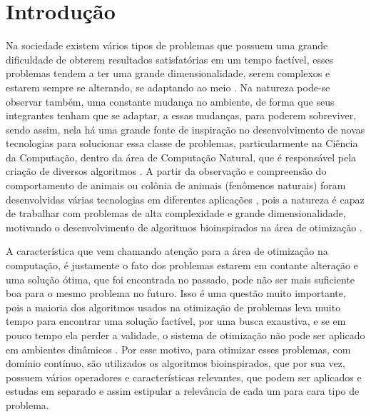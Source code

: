 \chapter{Introdução}
\label{ch:intro}

Na sociedade existem vários tipos de problemas que possuem uma grande dificuldade de obterem resultados satisfatórias em um tempo factível, esses problemas tendem a ter uma grande dimensionalidade, serem complexos e estarem sempre se alterando, se adaptando ao meio \cite{de2004otimizaccao}. Na natureza pode-se observar também, uma constante mudança no ambiente, de forma que seus integrantes tenham que se adaptar, a essas mudanças, para poderem sobreviver, sendo assim, nela há uma grande fonte de inspiração no desenvolvimento de novas tecnologias para solucionar essa classe de problemas, particularmente na Ciência da Computação, dentro da área de Computação Natural, que é responsável pela criação de diversos algoritmos \cite{de2007fundamentals}. A partir da observação e compreensão do comportamento de animais ou colônia de animais (fenômenos naturais) foram desenvolvidas várias tecnologias em diferentes aplicações \cite{rozenberg2011handbook}, pois a natureza é capaz de trabalhar com problemas de alta complexidade e grande dimensionalidade, motivando o desenvolvimento de algoritmos bioinspirados na área de otimização \cite{andre2015multiple}.

A característica que vem chamando atenção para a área de otimização na computação, é justamente o fato dos problemas estarem em contante alteração e uma solução ótima, que foi encontrada no passado, pode não ser mais suficiente boa para o mesmo problema no futuro. Isso é uma questão muito importante, pois a maioria dos algoritmos usados na otimização de problemas leva muito tempo para encontrar uma solução factível, por uma busca exaustiva, e se em pouco tempo ela perder a validade, o sistema de otimização não pode ser aplicado em ambientes dinâmicos \cite{morrison2003performance}. Por esse motivo, para otimizar esses problemas, com domínio contínuo, são utilizados os algoritmos bioinspirados, que por sua vez, possuem vários operadores e características relevantes, que podem ser aplicados e estudas em separado e assim estipular a relevância de cada um para cara tipo de problema.

